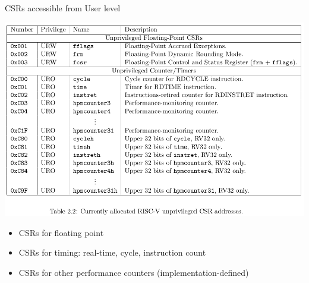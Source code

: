\documentclass{article}
\begin{document}
\clearpage


\begin{center}
  {\Huge
    CSRs accessible from User level}

  \vspace*{0.2in}

  \begin{minipage}{9in}\LARGE
    \begin{center}
      \includegraphics[width=7in]{Figs/CSRs_User_Level.png}
    \end{center}

    \begin{itemize}
    \item CSRs for floating point

    \item CSRs for timing: real-time, cycle, instruction count

    \item CSRs for other performance counters (implementation-defined)
    \end{itemize}
  \end{minipage}

\end{center}

\clearpage

\end{document}
